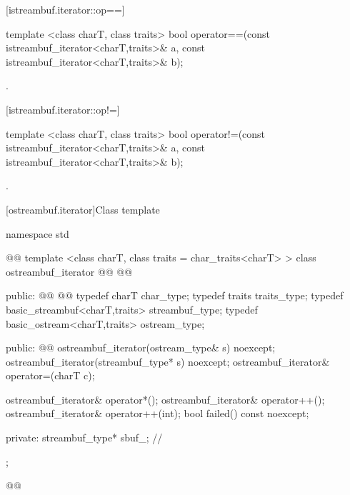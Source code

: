[istreambuf.iterator::op==]{}

%
\begin{itemdecl}
template <class charT, class traits>
  bool operator==(const istreambuf_iterator<charT,traits>& a,
                  const istreambuf_iterator<charT,traits>& b);
\end{itemdecl}

\begin{itemdescr}
\pnum
\returns
{}.
\end{itemdescr}

[istreambuf.iterator::op!=]{}

%
\begin{itemdecl}
template <class charT, class traits>
  bool operator!=(const istreambuf_iterator<charT,traits>& a,
                  const istreambuf_iterator<charT,traits>& b);
\end{itemdecl}

\begin{itemdescr}
\pnum
\returns
{}.
\end{itemdescr}

[ostreambuf.iterator]{Class template }

%
\begin{codeblock}
namespace std { @@
  template <class charT, class traits = char_traits<charT> >
  class ostreambuf_iterator @\removed{:}@
    @@ {
  public:
    @@
    @@
    typedef charT                         char_type;
    typedef traits                        traits_type;
    typedef basic_streambuf<charT,traits> streambuf_type;
    typedef basic_ostream<charT,traits>   ostream_type;

  public:
    @@
    ostreambuf_iterator(ostream_type& s) noexcept;
    ostreambuf_iterator(streambuf_type* s) noexcept;
    ostreambuf_iterator& operator=(charT c);

    ostreambuf_iterator& operator*();
    ostreambuf_iterator& operator++();
    ostreambuf_iterator& operator++(int);
    bool failed() const noexcept;

  private:
    streambuf_type* sbuf_;                // \expos
  };
}@\newtxt{\}\}}@
\end{codeblock}

